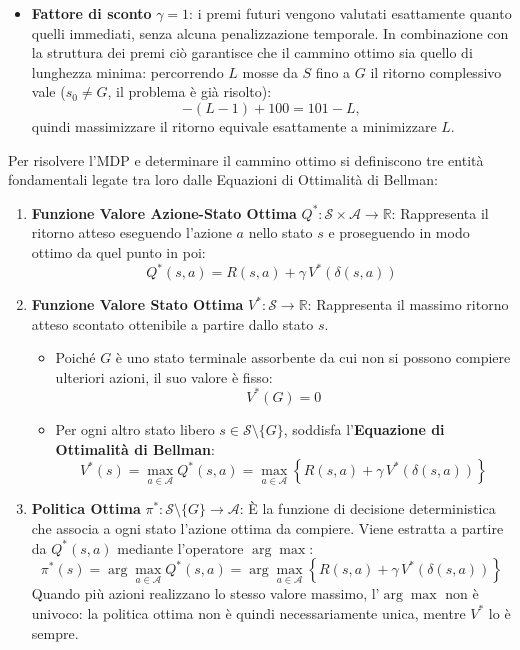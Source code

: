 \begin{itemize}
    \item \textbf{Fattore di sconto} $\gamma = 1$: i premi futuri vengono valutati esattamente quanto quelli immediati, senza alcuna penalizzazione temporale. In combinazione con la struttura dei premi ciò garantisce che il cammino ottimo sia quello di lunghezza minima: percorrendo $L$ mosse da $S$ fino a $G$ il ritorno complessivo vale ($s_0 \neq G$, il problema è già risolto):
    \[
    -(L-1) + 100 = 101 - L,
    \]
    quindi massimizzare il ritorno equivale esattamente a minimizzare $L$. 
\end{itemize}

\clearpage
\noindent
Per risolvere l'MDP e determinare il cammino ottimo si definiscono tre entità fondamentali legate tra loro dalle Equazioni di Ottimalità di Bellman:

\begin{enumerate}
    \item \textbf{Funzione Valore Azione-Stato Ottima} $Q^* : \mathcal{S} \times \mathcal{A} \to \mathbb{R}$:
    Rappresenta il ritorno atteso eseguendo l'azione $a$ nello stato $s$ e proseguendo in modo ottimo da quel punto in poi:
    \[
    Q^*(s,a) = R(s,a) + \gamma \, V^*(\delta(s,a))
    \]

    \item \textbf{Funzione Valore Stato Ottima} $V^* : \mathcal{S} \to \mathbb{R}$:
    Rappresenta il massimo ritorno atteso scontato ottenibile a partire dallo stato $s$.
    \begin{itemize}
        \item Poiché $G$ è uno stato terminale assorbente da cui non si possono compiere ulteriori azioni, il suo valore è fisso:
        \[
        V^*(G) = 0
        \]
        \item Per ogni altro stato libero $s \in \mathcal{S} \setminus \{G\}$, soddisfa l'\textbf{Equazione di Ottimalità di Bellman}:
        \[
        V^*(s) = \max_{a \in \mathcal{A}} Q^*(s,a) = \max_{a \in \mathcal{A}} \left\{ R(s,a) + \gamma \, V^*(\delta(s,a)) \right\}
        \]
    \end{itemize}

    \item \textbf{Politica Ottima} $\pi^* : \mathcal{S} \setminus \{G\} \to \mathcal{A}$:
    È la funzione di decisione deterministica che associa a ogni stato l'azione ottima da compiere. Viene estratta a partire da $Q^*(s,a)$ mediante l'operatore $\arg\max$:
    \[
    \pi^*(s) = \arg\max_{a \in \mathcal{A}} Q^*(s,a) = \arg\max_{a \in \mathcal{A}} \left\{ R(s,a) + \gamma \, V^*(\delta(s,a)) \right\}
    \]
    Quando più azioni realizzano lo stesso valore massimo, l'$\arg\max$ non è univoco: la politica ottima non è quindi necessariamente unica, mentre $V^*$ lo è sempre.
\end{enumerate}

